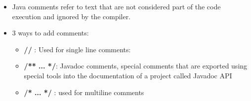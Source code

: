 
\begin{flushleft}
	
	\begin{itemize}
		
		\item Java comments refer to text that are not considered part of the code execution and ignored by the compiler. 
		\item 3 ways to add comments:
		\begin{itemize}
			\item \textbf{//} : Used for single line comments:
			\bigskip
			\item \textbf{/** ... */}: Javadoc comments, special comments that are exported using special tools into the documentation of a project called Javadoc API
			\bigskip
		
			\item \textbf{/* ... */} : used for multiline comments
			\bigskip
		\end{itemize}
	
		
		
		
		
		
		
		
	\end{itemize}	
	
	
\end{flushleft}
\newpage
